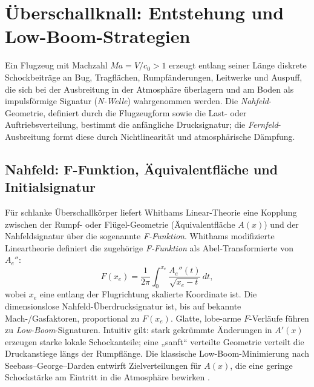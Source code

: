 \section{Überschallknall: Entstehung und Low-Boom-Strategien}
\label{schall:section:boom}

Ein Flugzeug mit Machzahl $Ma=V/c_0>1$ erzeugt entlang seiner Länge diskrete
Schockbeiträge an Bug, Tragflächen, Rumpfänderungen, Leitwerke und Auspuff,
die sich bei der Ausbreitung in der Atmosphäre überlagern und am Boden als impulsförmige
Signatur (\emph{N-Welle}) wahrgenommen werden.
Die \emph{Nahfeld}-Geometrie, definiert durch die Flugzeugform sowie die  Last- oder
Auftriebsverteilung, bestimmt die anfängliche Drucksignatur;
die \emph{Fernfeld}-Ausbreitung formt diese durch Nichtlinearität und atmosphärische Dämpfung.

\subsection{Nahfeld: F-Funktion, Äquivalentfläche und Initialsignatur}
Für schlanke Überschallkörper liefert Whithams Linear-Theorie eine Kopplung
zwischen der Rumpf- oder Flügel-Geometrie (Äquivalentfläche $A(x)$) und der
Nahfeldsignatur über die sogenannte \emph{F-Funktion}.
Whithams modifizierte Lineartheorie definiert die zugehörige \emph{F-Funktion}
als Abel-Transformierte von $A_e''$:
\begin{equation}
    F(x_e)=\frac{1}{2\pi}\int_{0}^{x_e}\frac{A_e''(t)}{\sqrt{x_e-t}}\,dt,
\end{equation}
wobei $x_e$ eine entlang der Flugrichtung skalierte Koordinate ist.
Die dimensionslose Nahfeld-Überdrucksignatur ist, bis auf bekannte
Mach-/Gasfaktoren, proportional zu $F(x_e)$.
Glatte, lobe-arme $F$-Verläufe führen zu \emph{Low-Boom}-Signaturen.
Intuitiv gilt: stark gekrümmte Änderungen in $A'(x)$ erzeugen starke lokale
Schockanteile; eine „sanft“ verteilte Geometrie verteilt die Druckanstiege
längs der Rumpflänge.
Die klassische Low-Boom-Minimierung nach Seebass–George–Darden entwirft
Zielverteilungen für $A(x)$, die eine geringe Schockstärke am Eintritt in
die Atmosphäre bewirken \cite{schall:whitham,schall:seebassgeorge,schall:darden75}.

